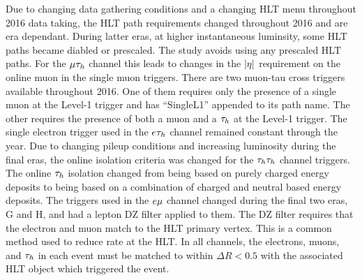 Due to changing data gathering conditions and a changing HLT menu throughout 2016 data taking, the HLT path
requirements changed throughout 2016 and are era dependant. During latter eras, at higher instantaneous 
luminsity, some HLT paths became diabled or prescaled. The study avoids using any prescaled
HLT paths. For the $\mu\tau_{h}$ channel this 
leads to changes in the $\lvert\eta\rvert$ requirement on the online muon in the single muon triggers.
There are two muon-tau cross triggers available throughout 2016. One of them requires only the
presence of a single muon at the Level-1 trigger and has ``SingleL1'' appended to its path
name. The other requires the presence of both a muon and a $\tau_{h}$ at the Level-1 trigger.
The single electron trigger used in the $e\tau_{h}$ channel remained constant through the year.
Due to changing pileup conditions and increasing luminosity during the final eras, the online
isolation criteria was changed for the $\tau_{h}\tau_{h}$ channel triggers. The online $\tau_{h}$ 
isolation changed from being based on purely charged energy deposits to being based on a 
combination of charged and neutral based energy deposits. The triggers used in the
$e\mu$ channel changed during the final two eras, G and H, and had a lepton DZ filter
applied to them. The DZ filter requires that the electron and muon match to the HLT primary
vertex. This is a common method used to reduce rate at the HLT. In all channels, the electrons, muons, and
$\tau_{h}$ in each event must be matched to within $\Delta R < 0.5$ with the associated
HLT object which triggered the event.



